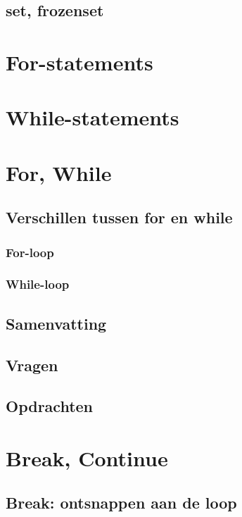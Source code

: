 \documentclass[a4paper,12pt,twoside,openright,titlepage]{book}
\begin{document}
\section{set, frozenset}

\chapter{For-statements}

\chapter{While-statements}

\chapter{For, While}

\section{Verschillen tussen for en while}

\subsection{For-loop}

\subsection{While-loop}

\section{Samenvatting}

\section{Vragen}

\section{Opdrachten}


\chapter{Break, Continue}
\section{Break: ontsnappen aan de loop}

\end{document}
